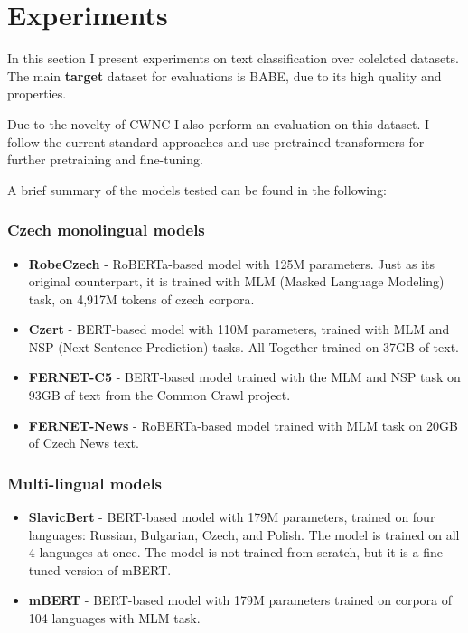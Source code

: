 \chapter{Experiments}\label{experiments}
In this section I present experiments on text classification over colelcted datasets. The main \textbf{target} dataset for evaluations is BABE, due to its high quality and properties.

Due to the novelty of CWNC I also perform an evaluation on this dataset.
I follow the current standard approaches and use pretrained transformers for further pretraining and fine-tuning. 

A brief summary of the models tested can be found in the following:




\subsection{Czech monolingual models}
\begin{itemize}
    \item \textbf{RobeCzech} \cite{strakarobeczech} - RoBERTa-based model with 125M parameters. Just as its original counterpart, it is trained with MLM (Masked Language Modeling) task, on 4,917M tokens of czech corpora.
    \item \textbf{Czert} \cite{sido-etal-2021-czert} - BERT-based model with 110M parameters, trained with MLM and NSP (Next Sentence Prediction) tasks. All Together trained on 37GB of text. 
    \item \textbf{FERNET-C5} \cite{lehevcka2021comparison} - BERT-based model trained with the MLM and NSP task on 93GB of text from the Common Crawl project.
    \item \textbf{FERNET-News} \cite{lehevcka2021comparison} - RoBERTa-based model trained with MLM task on 20GB of Czech News text.
\end{itemize}






\subsection{Multi-lingual models}
\begin{itemize}
    \item \textbf{SlavicBert} \cite{arkhipov2019tuning} - BERT-based model with 179M parameters, trained on four languages: Russian, Bulgarian, Czech, and Polish. The model is trained on all 4 languages at once. The model is not trained from scratch, but it is a fine-tuned version of mBERT.
    \item \textbf{mBERT} - BERT-based model with 179M parameters trained on corpora of 104 languages with MLM task.
\end{itemize}





